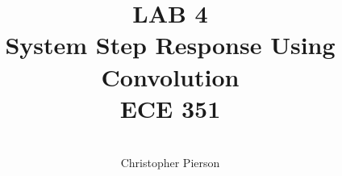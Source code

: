 



\documentclass[12pt]{article}

\usepackage[english]{babel}
\usepackage[utf8x]{inputenc}
\usepackage[T1]{fontenc}
\usepackage{graphicx}
\usepackage{amsmath}
\usepackage{caption}
\usepackage{float}
\usepackage{caption}
\usepackage{subcaption}
\usepackage{rotating}
\usepackage{setspace}

\usepackage[a4paper,top=3cm,bottom=2cm,left=3cm,right=3cm,marginparwidth=1.75cm]{geometry}

\usepackage[colorinlistoftodos]{todonotes}
\usepackage[colorlinks=true, allcolors=blue]{hyperref}
\usepackage{listings}
\usepackage{gensymb}



\title{%
	\textbf{LAB 4} \\
	System Step Response Using Convolution \\
	 ECE 351 }

\author{\\
	Christopher Pierson}

	
	
\vspace{\fill}
\maketitle
\vspace{\fill}
\clearpage

\tableofcontents

